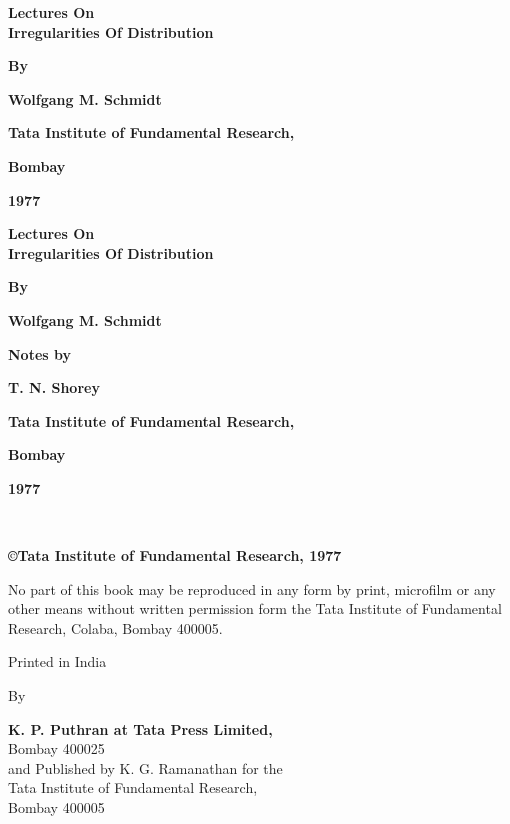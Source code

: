 \thispagestyle{empty}
\begin{center}
{\Large\bf Lectures On}\\[5pt]
{\Large\bf Irregularities Of Distribution}\\[5cm]
\vskip 1cm


{\bf  By}
\medskip


{\large\bf  Wolfgang M. Schmidt}
\vfill


{\bf  Tata Institute of Fundamental Research,}

{\bf Bombay}

{\bf  1977}
\end{center}

\eject

\thispagestyle{empty}



\begin{center}
{\Large\bf Lectures On}\\[5pt]
{\Large\bf Irregularities Of Distribution}\\[5cm]
\vskip 1cm


{\bf  By}
\medskip


{\large\bf  Wolfgang M. Schmidt}
\vfill


{\bf  Notes by}
\medskip

{\large\bf  T. N. Shorey}
\vfill

{\bf  Tata Institute of Fundamental Research,}

{\bf  Bombay}

{\bf  1977}
\end{center}

\eject

\thispagestyle{empty}
\begin{center}
  ~
  \vfill

 {\bf \copyright \quad Tata Institute of Fundamental Research, 1977}\\
\vfill


\parbox{0.7\textwidth}{No part of this book may be reproduced in any form by print,
    microfilm or any other means without written permission form the
    Tata Institute of Fundamental Research, Colaba, Bombay 400005.}
\vfill


  Printed in India

  By

 {\bf K. P. Puthran at Tata Press Limited,}\\ 
  Bombay 400025\\
  and Published by  K. G. Ramanathan for the\\
  Tata Institute of Fundamental Research,\\
  Bombay 400005
\end{center}

